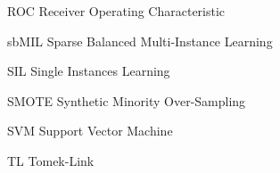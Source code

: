             {ROC}
            {Receiver Operating Characteristic}
            
            {sbMIL}
            {Sparse Balanced Multi-Instance Learning}
                    
            {SIL}
            {Single Instances Learning}
            
            {SMOTE}
            {Synthetic Minority Over-Sampling}
            
            {SVM}
            {Support Vector Machine}
            
            {TL}
            {Tomek-Link}
            
